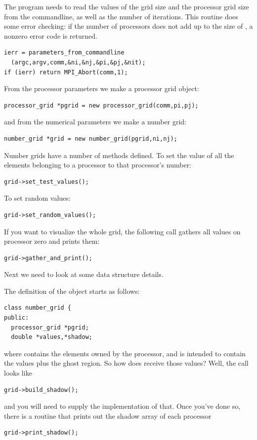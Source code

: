 The program needs to read the values of the grid size and the
processor grid size from the commandline, as well as the number of
iterations. This routine does some error checking: if the number of
processors does not add up to the size of , a
nonzero error code is returned.
\begin{verbatim}
ierr = parameters_from_commandline
  (argc,argv,comm,&ni,&nj,&pi,&pj,&nit);
if (ierr) return MPI_Abort(comm,1);
\end{verbatim}
From the processor parameters we make a processor grid object:
\begin{verbatim}
processor_grid *pgrid = new processor_grid(comm,pi,pj);
\end{verbatim}
and from the numerical parameters we make a number grid:
\begin{verbatim}
number_grid *grid = new number_grid(pgrid,ni,nj);
\end{verbatim}
Number grids have a number of methods defined. To set the value of all
the elements belonging to a processor to that processor's number:
\begin{verbatim}
grid->set_test_values();
\end{verbatim}
To set random values:
\begin{verbatim}
grid->set_random_values();
\end{verbatim}
If you want to visualize the whole grid, the following call gathers
all values on processor zero and prints them:
\begin{verbatim}
grid->gather_and_print();
\end{verbatim}

Next we need to look at some data structure details.

The definition of the  object starts as follows:
\begin{verbatim}
class number_grid {
public:
  processor_grid *pgrid;
  double *values,*shadow;
\end{verbatim}
where  contains the elements owned by the processor,
and  is intended to contain the values plus the ghost
region. So how does  receive those values? Well, the call looks 
like
\begin{verbatim}
grid->build_shadow();
\end{verbatim}
and you will need to supply the implementation of that.
Once you've done so, there is a routine that prints out the shadow array 
of each processor
\begin{verbatim}
grid->print_shadow();
\end{verbatim}

